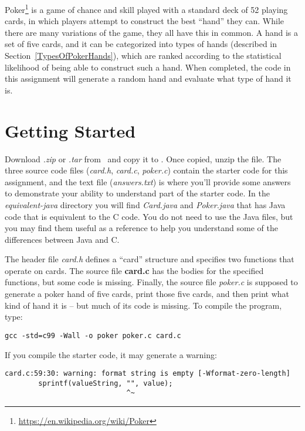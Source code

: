 Poker\footnote{\url{https://en.wikipedia.org/wiki/Poker}} is a game of chance
and skill played with a standard deck of 52 playing cards, in which players
attempt to construct the best ``hand'' they can. While there are many
variations of the game, they all have this in common. A hand is a set of five
cards, and it can be categorized into types of hands (described in
Section~\ref{TypesOfPokerHands}), which are ranked according to the statistical
likelihood of being able to construct such a hand. When completed, the code in
this assignment will generate a random hand and evaluate what type of hand it
is.

\section{Getting Started}

Download \textit{\shortlabname.zip} or \textit{\shortlabname.tar} from
\filesource\ and copy it to \runtimeenvironment. Once copied, unzip the file.
The three source code files (\textit{card.h}, \textit{card.c},
\textit{poker.c}) contain the starter code for this assignment, and the text
file (\textit{answers.txt}) is where you'll provide some answers to demonstrate
your ability to understand part of the starter code. In the
\mbox{\textit{equivalent-java}} directory you will find \textit{Card.java} and
\textit{Poker.java} that has Java code that is equivalent to the C code. You do
not need to use the Java files, but you may find them useful as a reference to
help you understand some of the differences between Java and C.

The header file \textit{card.h} defines a ``card'' structure and specifies two
functions that operate on cards. The source file \textbf{card.c} has the bodies
for the specified functions, but some code is missing. Finally, the source file
\textit{poker.c} is supposed to generate a poker hand of five cards, print
those five cards, and then print what kind of hand it is -- but much of its
code is missing. To compile the program, type:

\texttt{gcc -std=c99 -Wall -o poker poker.c card.c}

If you compile the starter code, it may generate a warning:

\begin{verbatim}
card.c:59:30: warning: format string is empty [-Wformat-zero-length]
        sprintf(valueString, "", value);
                             ^~
\end{verbatim}

